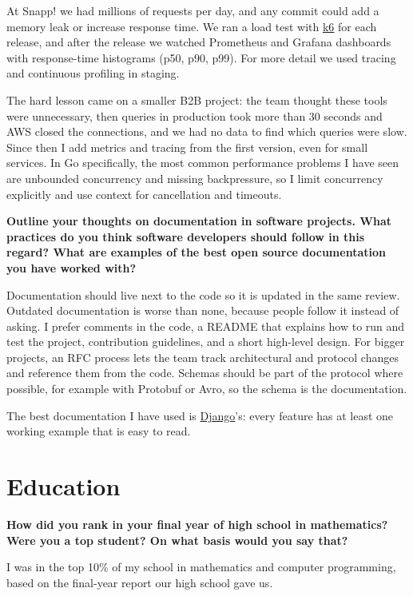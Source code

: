 At Snapp! we had millions of requests per day, and any commit could add a memory leak or increase response time. We ran a load test with
\href{https://github.com/grafana/k6}{k6} for each release, and after the release we watched Prometheus and Grafana dashboards with response-time
histograms (p50, p90, p99). For more detail we used tracing and continuous profiling in staging.

The hard lesson came on a smaller B2B project: the team thought these tools were unnecessary, then queries in production took more than 30 seconds and
AWS closed the connections, and we had no data to find which queries were slow. Since then I add metrics and tracing from the first version, even for
small services. In Go specifically, the most common performance problems I have seen are unbounded concurrency and missing backpressure, so I limit
concurrency explicitly and use context for cancellation and timeouts.

\noindent
\textbf{Outline your thoughts on documentation in software projects. What practices do you think software developers
should follow in this regard? What are examples of the best open source documentation you have worked with?}

Documentation should live next to the code so it is updated in the same review. Outdated documentation is worse than none, because people follow it
instead of asking. I prefer comments in the code, a README that explains how to run and test the project, contribution guidelines, and a short
high-level design. For bigger projects, an RFC process lets the team track architectural and protocol changes and reference them from the code.
Schemas should be part of the protocol where possible, for example with Protobuf or Avro, so the schema is the documentation.

The best documentation I have used is \href{https://docs.djangoproject.com/}{Django}'s: every feature has at least one working example that is easy to read.

\section{Education}

\noindent
\textbf{How did you rank in your final year of high school in mathematics? Were you a top student? On what basis would you say that?}

I was in the top 10\% of my school in mathematics and computer programming, based on the final-year report our high school gave us.

